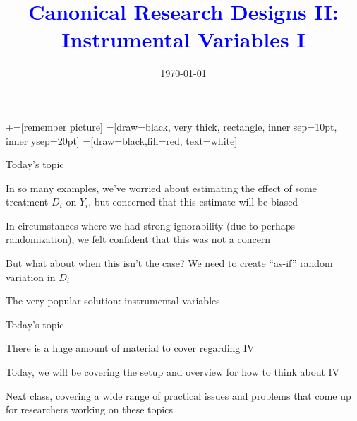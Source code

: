 \documentclass[notes,11pt, aspectratio=169]{beamer}
\title[]{\textcolor{blue}{Canonical Research Designs II:\\ Instrumental Variables I }}
\author[PGP]{}
\institute[FRBNY]{\small{\begin{tabular}{c}
  Paul Goldsmith-Pinkham  \\
\end{tabular}}}
\date{\today}
\newenvironment{wideitemize}{\itemize\addtolength{\itemsep}{10pt}}{\enditemize}
\begin{document}
\newcommand\marktopleft[1]{%
    \tikz[overlay,remember picture] 
        \node (marker-#1-a) at (-.3em,.3em) {};%
}
\newcommand\markbottomright[2]{%
    \tikz[overlay,remember picture] 
        \node (marker-#1-b) at (0em,0em) {};%
}
+=[remember picture] 
 =[draw=black, very thick, rectangle, inner sep=10pt, inner ysep=20pt]
 =[draw=black,fill=red, text=white]

\begin{frame}
\maketitle
\end{frame}


\begin{frame}{Today's topic}
  \begin{wideitemize}
  \item In so many examples, we've worried about estimating the effect
    of some treatment $D_{i}$ on $Y_{i}$, but concerned that this
    estimate will be biased
  \item In circumstances where we had strong ignorability (due to
    perhaps randomization), we felt confident that this was not a concern
  \item But what about when this isn't the case? We need to create
    ``as-if'' random variation in $D_{i}$
  \item The very popular solution: instrumental variables
  \end{wideitemize}
\end{frame}

\begin{frame}{Today's topic}
  \begin{wideitemize}
  \item There is a huge amount of material to cover regarding IV
  \item Today, we will be covering the setup and overview for how to think about IV
  \item Next class, covering a wide range of practical issues and
    problems that come up for researchers working on these topics
  \end{wideitemize}
\end{frame}
\end{document}
